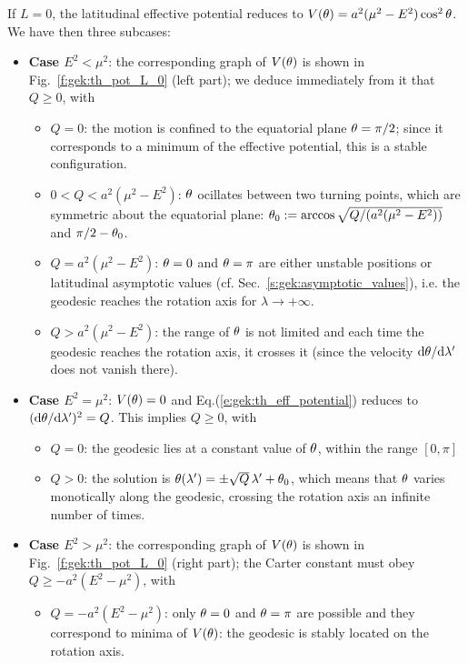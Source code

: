 If $L=0$, the latitudinal effective potential reduces to $V(\theta)=a^2(\mu^2 - E^2)\cos^2\theta$.
We have then three subcases:

\begin{itemize}
\item \textbf{Case $E^2 < \mu^2$}: the corresponding graph of $V(\theta)$ is shown in
Fig.~\ref{f:gek:th_pot_L_0} (left part); we deduce immediately from it that
$Q\geq 0$, with
\begin{itemize}
\item $Q=0$: the motion is confined to the equatorial
plane $\theta=\pi/2$; since it corresponds to a minimum of the effective potential, this
is a stable configuration.
\item $0<Q< a^2(\mu^2 - E^2)$: $\theta$ ocillates between
two turning points, which are symmetric about the equatorial plane:
$\theta_0 := \arccos\sqrt{Q/(a^2(\mu^2 - E^2))}$
and $\pi/2-\theta_0$.
\item $Q = a^2(\mu^2 - E^2)$: $\theta=0$ and $\theta=\pi$
are either unstable positions or
latitudinal asymptotic values (cf. Sec.~\ref{s:gek:asymptotic_values}), i.e.
the geodesic reaches the rotation axis for $\lambda\to+\infty$.
\item $Q > a^2(\mu^2 - E^2)$:
the range of $\theta$ is not limited and each time the geodesic reaches the
rotation axis, it crosses it (since the velocity $\mathrm{d}\theta / \mathrm{d}\lambda'$
does not vanish there).
\end{itemize}
\item \textbf{Case $E^2 = \mu^2$}: $V(\theta)=0$ and Eq.(\ref{e:gek:th_eff_potential})
reduces to $(\mathrm{d}\theta/\mathrm{d}\lambda')^2 = Q$. This implies $Q\geq 0$, with
\begin{itemize}
\item $Q=0$: the geodesic lies at a constant value of $\theta$, within the range
$[0,\pi]$
\item $Q>0$: the solution is $\theta(\lambda') = \pm \sqrt{Q}\, \lambda' + \theta_0$, which
means that $\theta$ varies monotically along the geodesic, crossing the rotation
axis an infinite number of times.
\end{itemize}
\item \textbf{Case $E^2 > \mu^2$}: the corresponding graph of $V(\theta)$ is shown in
Fig.~\ref{f:gek:th_pot_L_0} (right part); the Carter constant must obey
$Q \geq - a^2 (E^2 - \mu^2)$, with
\begin{itemize}
\item $Q=-a^2(E^2 - \mu^2)$: only $\theta=0$ and
$\theta=\pi$ are possible and they correspond to minima of $V(\theta)$:
the geodesic is stably located on the rotation axis.

\end{itemize}
\end{itemize}
